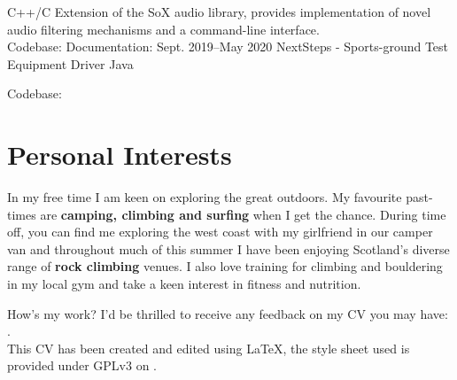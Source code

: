 \documentclass[]{cv-style}     %
\begin{document}
\begin{minipage}[b]{1.4\textwidth}
\begin{entrylist}
{C++/C}
{
Extension of the SoX audio library, provides implementation of novel audio filtering mechanisms and a command-line interface.\\
Codebase:  Documentation: 
} 
\vspace{0.1cm}
\entry
{Sept. 2019--May 2020}
{NextSteps - Sports-ground Test Equipment Driver}
{Java}
{
Codebase: 


}
\end{entrylist}
  \vspace{0.2cm}
\end{minipage}
\vspace{0.0}\hspace*{-5.5cm}\begin{minipage}[b]{1.4\textwidth}
\section{Personal Interests}
  \vspace{0.05cm}
In my free time I am keen on exploring the great outdoors. My favourite past-times are \textbf{camping, climbing and surfing} when I get the chance. During time off, you can find me exploring the west coast with my girlfriend in our camper van and throughout much of this summer I have been enjoying Scotland's diverse range of \textbf{rock climbing} venues. I also love training for climbing and bouldering in my local gym and take a keen interest in fitness and nutrition.

\end{minipage}

\vspace{-0.1cm}\hspace{1cm}\begin{minipage}[b]{\textwidth}
\hline
\vspace{0.05cm}
\footnotesize{
How's my work? I'd be thrilled to receive any feedback on my CV you may have: .\\
This CV has been created and edited using \LaTeX, the style sheet used is provided under GPLv3 on .}
\end{minipage}
\end{document}
